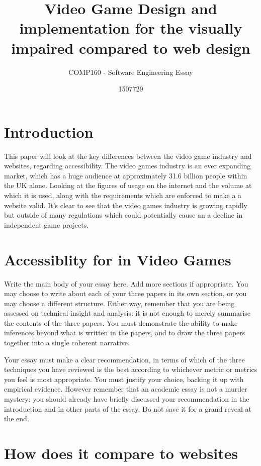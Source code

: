 \documentclass{scrartcl}
\title{Video Game Design and implementation for the visually impaired compared to web design}
\subtitle{COMP160 - Software Engineering Essay}
\author{1507729}
\begin{document}
\maketitle



\section{Introduction}

This paper will look at the key differences between the video game industry and websites, regarding accessibility. The video games industry is an ever expanding market, which has a huge audience at approximately 31.6 billion people within the UK alone. \cite{UKIE2017Games} Looking at the figures of usage on the internet and the volume at which it is used, along with the requirements which are enforced to make a a website valid. \cite{world2017internet} \cite{caldwell2008web} It's clear to see that the video games industry is growing rapidly but outside of many regulations which could potentially cause an a decline in independent game projects.

\section{Accessiblity for in Video Games}

Write the main body of your essay here. Add more sections if appropriate. You may choose to write about each of your three papers in its own section, or you may choose a different structure. Either way, remember that you are being assessed on technical insight and analysis: it is not enough to merely summarise the contents of the three papers. You must demonstrate the ability to make inferences beyond what is written in the papers, and to draw the three papers together into a single coherent narrative.

Your essay must make a clear recommendation, in terms of which of the three techniques you have reviewed is the best according to whichever metric or metrics you feel is most appropriate. You must justify your choice, backing it up with empirical evidence. However remember that an academic essay is not a murder mystery: you should already have briefly discussed your recommendation in the introduction and in other parts of the essay. Do not save it for a grand reveal at the end.

\section{How does it compare to websites}
\end{document}
